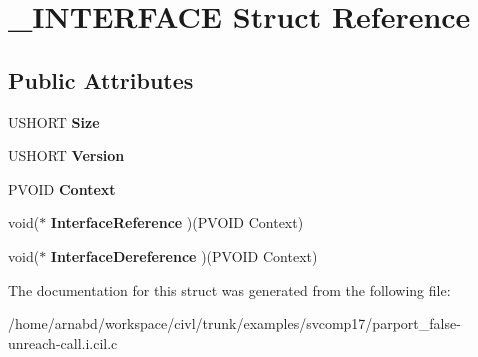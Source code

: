 \hypertarget{struct__INTERFACE}{}\section{\+\_\+\+I\+N\+T\+E\+R\+F\+A\+C\+E Struct Reference}
\label{struct__INTERFACE}
\subsection*{Public Attributes}
\begin{DoxyCompactItemize}
\item 
\hypertarget{struct__INTERFACE_abcdaf4968ba45d92e3c74a5aa6046b86}{}U\+S\+H\+O\+R\+T {\bfseries Size}\label{struct__INTERFACE_abcdaf4968ba45d92e3c74a5aa6046b86}

\item 
\hypertarget{struct__INTERFACE_ab4bc701d6eabcc3b92554cb023f6e1ae}{}U\+S\+H\+O\+R\+T {\bfseries Version}\label{struct__INTERFACE_ab4bc701d6eabcc3b92554cb023f6e1ae}

\item 
\hypertarget{struct__INTERFACE_a5b9847c7aae3c2ede862c93824914e8b}{}P\+V\+O\+I\+D {\bfseries Context}\label{struct__INTERFACE_a5b9847c7aae3c2ede862c93824914e8b}

\item 
\hypertarget{struct__INTERFACE_a33726186780e5c2fe183cb77a8b25daf}{}void($\ast$ {\bfseries Interface\+Reference} )(P\+V\+O\+I\+D Context)\label{struct__INTERFACE_a33726186780e5c2fe183cb77a8b25daf}

\item 
\hypertarget{struct__INTERFACE_aa204645f5d938359846089122baac85c}{}void($\ast$ {\bfseries Interface\+Dereference} )(P\+V\+O\+I\+D Context)\label{struct__INTERFACE_aa204645f5d938359846089122baac85c}

\end{DoxyCompactItemize}


The documentation for this struct was generated from the following file\+:\begin{DoxyCompactItemize}
\item 
/home/arnabd/workspace/civl/trunk/examples/svcomp17/parport\+\_\+false-\/unreach-\/call.\+i.\+cil.\+c\end{DoxyCompactItemize}
